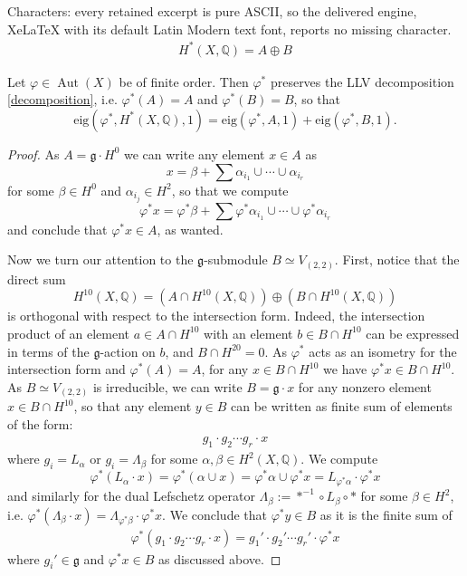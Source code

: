 \documentclass[10pt,a4paper]{amsart}
\newcommand{\Aut}{\operatorname{Aut}}
\newcommand{\Q}{{\mathbb Q}}
\newcommand{\V}[2]{V_{(#1,#2)}}
\newcommand{\eig}{{\mathrm{eig}}}
\newcommand{\kg}{{\mathfrak g}}
\begin{document}
Characters: every retained excerpt is pure ASCII, so the delivered engine, XeLaTeX with its default Latin Modern text font, reports no missing character.
        \begin{align}\label{decomposition}
            H^*(X,\mathbb{Q}) = A \oplus B
        \end{align}

    \begin{proposition}\label{prop:AB-eig}
        Let $\varphi\in \Aut (X)$ be of finite order. Then $\varphi^*$ preserves the LLV decomposition \eqref{decomposition}, i.e. $\varphi^*(A) = A$ and $\varphi^*(B) = B$, so that
        \[
        \eig (\varphi^*, H^*(X,\Q),1) = \eig (\varphi^*, A,1) + \eig(\varphi^*, B,1).
        \]
    \end{proposition}

    \begin{proof}
        As $A= \mathfrak g \cdot H^0$ we can write any element $x\in A$ as
        \[
        x = \beta + \sum \alpha_{i_1} \cup \cdots\cup \alpha_{i_r}
        \]
        for some $\beta\in H^0$ and $\alpha_{i_j}\in H^2$, so that we compute 
        \[
        \varphi^*x = \varphi^*\beta + \sum \varphi^*\alpha_{i_1} \cup \cdots\cup \varphi^*\alpha_{i_r}
        \]
        and conclude that $\varphi^* x\in A$, as wanted.

        Now we turn our attention to the $\kg$-submodule $B\simeq\V22$. First, notice that the direct sum
        \[
        H^{10}(X,\Q) = \left( A \cap H^{10}(X,\Q) \right) \oplus \left( B \cap H^{10}(X,\Q)\right)
        \]
        is orthogonal with respect to the intersection form. Indeed, the intersection product of an element $a\in A\cap H^{10}$ with an element $b\in B\cap H^{10}$ can be expressed in terms of the $\kg$-action on $b$, and \(B\cap H^{20}=0\).
        As $\varphi^*$ acts as an isometry for the intersection form and $\varphi^* (A) = A$, for any $x\in B \cap H^{10}$ we have $\varphi^* x\in B \cap H^{10}$. As $B\simeq\V22$ is irreducible, we can write $B = \mathfrak g \cdot x$ for any nonzero element $x\in B \cap H^{10}$, so that any element $y\in B$ can be written as finite sum of elements of the form:
\begin{align*}
    g_1\cdot g_2\cdots g_r \cdot x
\end{align*}
where $g_i=L_{\alpha}$ or $g_i=\Lambda_{\beta}$ for some $\alpha, \beta \in H^2(X,\mathbb Q)$.
        We compute
        \[
        \varphi^* (L_\alpha\cdot x) = \varphi^* (\alpha\cup x) = \varphi^* \alpha\cup \varphi^* x = L_{\varphi^* \alpha}\cdot \varphi^* x
        \] 
        and similarly for the dual Lefschetz operator $\Lambda_\beta := *^{-1}\circ L_\beta \circ *$ for some $\beta\in H^2$, i.e. $\varphi^*(\Lambda_\beta \cdot x) = \Lambda_{\varphi^*\beta} \cdot \varphi^* x$. We conclude that $\varphi^* y\in B$ as it is the finite sum of 
\begin{align*}
    \varphi^* (g_1\cdot g_2\cdots g_r \cdot x ) = g_1'\cdot g_2'\cdots g_r' \cdot \varphi^*x
\end{align*}
where $g_i'\in \kg$ and $\varphi^*x \in B$ as discussed above.
    \end{proof}
\end{document}
